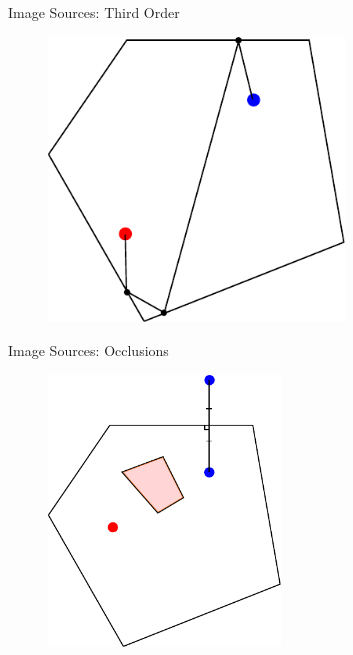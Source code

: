 \documentclass{beamer}
\begin{document}
\begin{frame}{Image Sources: Third Order}

\begin{figure}[t]
	\centering
    \includegraphics[width=0.7\textwidth]{ImageSources2MultiDrawn5.pdf}
\end{figure}

\end{frame}

\begin{frame}{Image Sources: Occlusions}

\begin{figure}[t]
	\centering
    \includegraphics[width=0.55\textwidth]{ImageSourcesOcclusion.pdf}
\end{figure}

\end{frame}
\end{document}

